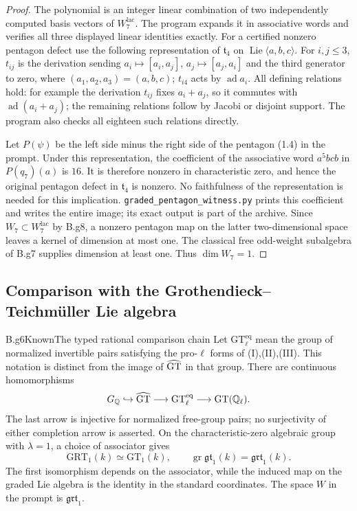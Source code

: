 \begin{proof}
The polynomial is an integer linear combination of two independently
computed basis vectors of $W^{\mathrm{lac}}_7$.  The program expands
it in associative words and verifies all three displayed linear
identities exactly.
For a certified nonzero pentagon defect use the following representation
of $\mathfrak t_4$ on $\operatorname{Lie}\langle a,b,c\rangle$.
For $i,j\leq3$, $t_{ij}$ is the derivation sending
$a_i\mapsto[a_i,a_j]$, $a_j\mapsto[a_j,a_i]$ and the third generator
to zero, where $(a_1,a_2,a_3)=(a,b,c)$; $t_{i4}$ acts by
$\operatorname{ad}a_i$.
All defining relations hold: for example the derivation $t_{ij}$ fixes
$a_i+a_j$, so it commutes with
$\operatorname{ad}(a_i+a_j)$; the remaining relations follow by Jacobi
or disjoint support.  The program also checks all eighteen such
relations directly.

Let $P(\psi)$ be the left side minus the right side of the pentagon
(1.4) in the prompt.  Under this representation, the coefficient of
the associative word $a^5bcb$ in $P(q_7)(a)$ is $16$.
It is therefore nonzero in characteristic zero, and hence the original
pentagon defect in $\mathfrak t_4$ is nonzero.  No faithfulness of the
representation is needed for this implication.
\nolinkurl{graded_pentagon_witness.py} prints this coefficient and
writes the entire image; its exact output is part of the archive.
Since $W_7\subset W^{\mathrm{lac}}_7$ by B.g8, a nonzero pentagon
map on the latter two-dimensional space leaves a kernel of dimension
at most one.  The classical free odd-weight subalgebra of B.g7
supplies dimension at least one.  Thus $\dim W_7=1$.
\end{proof}

\subsection{Comparison with the Grothendieck--Teichm\"uller Lie algebra}

\begin{claim}{B.g6}{Known}{The typed rational comparison chain}
Let $\mathrm{GT}^{\mathrm{eq}}_\ell$ mean the group of normalized
invertible pairs satisfying the pro-$\ell$ forms of (I),(II),(III).
This notation is distinct from the image of $\widehat{\mathrm{GT}}$ in that group.
There are continuous homomorphisms
\[
 G_{\mathbb Q}\hookrightarrow\widehat{\mathrm{GT}}
 \longrightarrow\mathrm{GT}^{\mathrm{eq}}_\ell
 \longrightarrow\mathrm{GT}(\mathbb Q_\ell).
\]
The last arrow is injective for normalized free-group pairs; no
surjectivity of either completion arrow is asserted.  On the
characteristic-zero algebraic group with $\lambda=1$, a choice of
associator gives
\[
 \mathrm{GRT}_1(k)\simeq\mathrm{GT}_1(k),\qquad
 \operatorname{gr}\mathfrak{gt}_1(k)=\mathfrak{grt}_1(k).
\]
The first isomorphism depends on the associator, while the induced
map on the graded Lie algebra is the identity in the standard
coordinates.  The space $W$ in the prompt is $\mathfrak{grt}_1$.
\end{claim}

